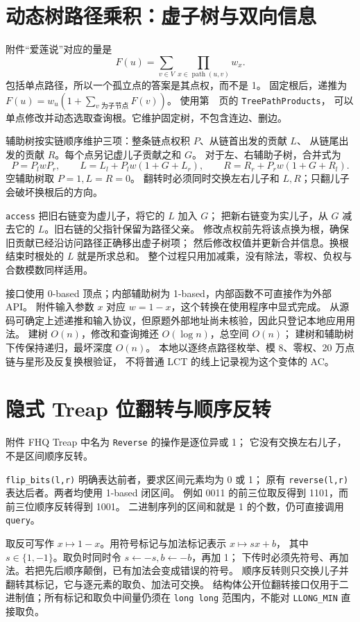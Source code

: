 \section{动态树路径乘积：虚子树与双向信息}\label{knowledge-lct-product}
附件“爱莲说”对应的量是
\[
F(u)=\sum_{v\in V}\prod_{x\in\operatorname{path}(u,v)}w_x.
\]
包括单点路径，所以一个孤立点的答案是其点权，而不是 1。
固定根后，递推为 $F(u)=w_u(1+\sum_{v\text{ 为子节点}}F(v))$。
使用第~\pageref{compact-TreePathProducts}~页的 \texttt{TreePathProducts}，
可以单点修改并动态选取查询根。它维护固定树，不包含连边、删边。

辅助树按实链顺序维护三项：整条链点权积 $P$、从链首出发的贡献 $L$、
从链尾出发的贡献 $R$。每个点另记虚儿子贡献之和 $G$。
对于左、右辅助子树，合并式为
\[
P=P_lwP_r,\qquad
L=L_l+P_lw(1+G+L_r),\qquad
R=R_r+P_rw(1+G+R_l).
\]
空辅助树取 $P=1,L=R=0$。
翻转时必须同时交换左右儿子和 $L,R$；只翻儿子会破坏换根后的方向。

\texttt{access} 把旧右链变为虚儿子，将它的 $L$ 加入 $G$；
把新右链变为实儿子，从 $G$ 减去它的 $L$。旧右链的父指针保留为路径父亲。
修改点权前先将该点换为根，确保旧贡献已经沿访问路径正确移出虚子树项；
然后修改权值并更新合并信息。换根结束时根处的 $L$ 就是所求总和。
整个过程只用加减乘，没有除法，零权、负权与合数模数同样适用。

接口使用 0-based 顶点；内部辅助树为 1-based，内部函数不可直接作为外部 API。
附件输入参数 $x$ 对应 $w=1-x$，这个转换在使用程序中显式完成。
从源码可确定上述递推和输入协议，但原题外部地址尚未核验，因此只登记本地应用用法。
建树 $O(n)$，修改和查询摊还 $O(\log n)$，总空间 $O(n)$；
建树和辅助树下传保持递归，最坏深度 $O(n)$。
本地以逐终点路径枚举、模 8、零权、20 万点链与星形及反复换根验证，
不将普通 LCT 的线上记录视为这个变体的 AC。

\section{隐式 Treap 位翻转与顺序反转}\label{knowledge-treap-flip}
附件 FHQ Treap 中名为 \texttt{Reverse} 的操作是逐位异或 1；
它没有交换左右儿子，不是区间顺序反转。

\texttt{flip\_bits(l,r)} 明确表达前者，要求区间元素均为 0 或 1；
原有 \texttt{reverse(l,r)} 表达后者。两者均使用 1-based 闭区间。
例如 0011 的前三位取反得到 1101，而前三位顺序反转得到 1001。
二进制序列的区间和就是 1 的个数，仍可直接调用 \texttt{query}。

取反可写作 $x\mapsto1-x$。用符号标记与加法标记表示 $x\mapsto sx+b$，
其中 $s\in\{1,-1\}$。取负时同时令 $s\gets-s,b\gets-b$，再加 1；
下传时必须先符号、再加法。若把先后顺序颠倒，已有加法会变成错误的符号。
顺序反转则只交换儿子并翻转其标记，它与逐元素的取负、加法可交换。
结构体公开位翻转接口仅用于二进制值；所有标记和取负中间量仍须在
\texttt{long long} 范围内，不能对 \texttt{LLONG\_MIN} 直接取负。

